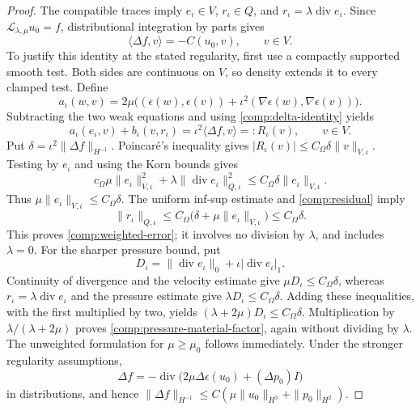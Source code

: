 \documentclass[11pt,a4paper]{article}
\theoremstyle{remark}
\numberwithin{equation}{section}
\begin{document}
\begin{proof}
The compatible traces imply $e_\iota\in V$, $r_\iota\in Q$, and
$r_\iota=\lambda\operatorname{div}e_\iota$. Since
$\mathcal L_{\lambda,\mu}u_0=f$, distributional integration by parts gives
\begin{equation}\label{comp:delta-identity}
 \langle\Delta f,v\rangle=-C(u_0,v),\qquad v\in V.
\end{equation}
To justify this identity at the stated regularity, first use a compactly
supported smooth test. Both sides are continuous on $V$, so density extends
it to every clamped test. Define
\[
 a_\iota(w,v)=2\mu\bigl((\epsilon(w),\epsilon(v))
                  +\iota^2(\nabla\epsilon(w),\nabla\epsilon(v))\bigr).
\]
Subtracting the two weak equations and using \eqref{comp:delta-identity}
yields
\begin{equation}\label{comp:residual}
 a_\iota(e_\iota,v)+b_\iota(v,r_\iota)
 =\iota^2\langle\Delta f,v\rangle=:R_\iota(v),
 \qquad v\in V.
\end{equation}
Put $\delta=\iota^2\|\Delta f\|_{H^{-1}}$. Poincar\'e's inequality gives
$|R_\iota(v)|\le C_\Omega\delta\|v\|_{V,\iota}$.
Testing by $e_\iota$ and using the Korn bounds gives
\[
 c_\Omega\mu\|e_\iota\|_{V,\iota}^2
 +\lambda\|\operatorname{div}e_\iota\|_{Q,\iota}^2
 \le C_\Omega\delta\|e_\iota\|_{V,\iota}.
\]
Thus $\mu\|e_\iota\|_{V,\iota}\le C_\Omega\delta$.
The uniform inf-sup estimate and \eqref{comp:residual} imply
\[
 \|r_\iota\|_{Q,\iota}
 \le C_\Omega\bigl(\delta+\mu\|e_\iota\|_{V,\iota}\bigr)
 \le C_\Omega\delta.
\]
This proves \eqref{comp:weighted-error}; it involves no division by
$\lambda$, and includes $\lambda=0$.
For the sharper pressure bound, put
\[
 D_\iota=\|\operatorname{div}e_\iota\|_0
                   +\iota|\operatorname{div}e_\iota|_1.
\]
Continuity of divergence and the velocity estimate give
$\mu D_\iota\le C_\Omega\delta$, whereas
$r_\iota=\lambda\operatorname{div}e_\iota$ and the pressure estimate give
$\lambda D_\iota\le C_\Omega\delta$.
Adding these inequalities, with the first multiplied by two, yields
$(\lambda+2\mu)D_\iota\le C_\Omega\delta$.
Multiplication by $\lambda/(\lambda+2\mu)$ proves
\eqref{comp:pressure-material-factor}, again without dividing by $\lambda$.
The unweighted formulation for $\mu\ge\mu_0$ follows immediately.
Under the stronger regularity assumptions,
\[
 \Delta f=-\operatorname{div}
          \bigl(2\mu\Delta\epsilon(u_0)+(\Delta p_0)I\bigr)
\]
in distributions, and hence
$\|\Delta f\|_{H^{-1}}\le
C(\mu\|u_0\|_{H^3}+\|p_0\|_{H^2})$.
\end{proof}
\end{document}
